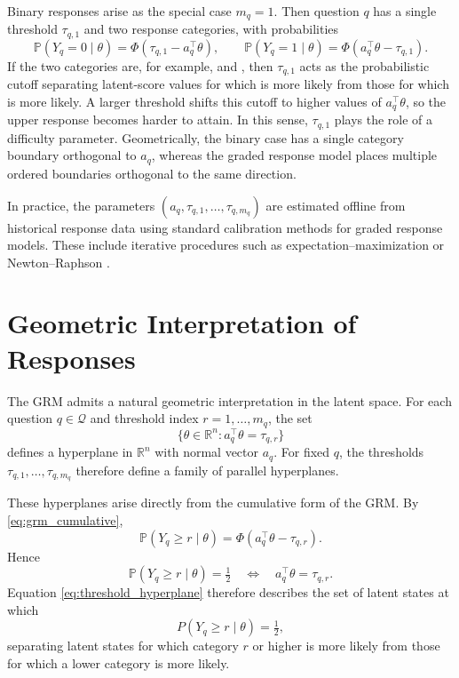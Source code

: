 \documentclass{article}
\begin{document}
\begin{remark}\label{rem:binary}
    Binary responses arise as the special case $m_q = 1$. Then question $q$ has a
single threshold $\tau_{q,1}$ and two response categories, with probabilities
\begin{equation*}
\mathbb P(Y_q = 0 \mid \theta) = \Phi(\tau_{q,1} - a_q^\top \theta),
\qquad
\mathbb P(Y_q = 1 \mid \theta) = \Phi(a_q^\top \theta - \tau_{q,1}).
\label{eq:grm_binary_special_case}
\end{equation*}
If the two categories are, for example,  and , then $\tau_{q,1}$
acts as the probabilistic cutoff separating latent-score values for which 
is more likely from those for which  is more likely. A larger threshold
shifts this cutoff to higher values of $a_q^\top \theta$, so the upper response
becomes harder to attain. In this sense, $\tau_{q,1}$ plays the role of a difficulty
parameter. Geometrically, the binary case has a single category boundary orthogonal
to $a_q$, whereas the graded response model places multiple ordered boundaries
orthogonal to the same direction.
\end{remark}

In practice, the parameters $(a_q,\tau_{q,1},\dots,\tau_{q,m_q})$ are estimated offline from historical response data using standard calibration methods for graded response models. These include iterative procedures such as expectation--maximization or Newton--Raphson \cite{bockAitkin1981,hambletonSwaminathanRogers1991irt}.

\section{Geometric Interpretation of Responses}\label{sec:geo}

The GRM admits a natural geometric interpretation in the latent space. For each
question $q \in \mathcal Q$ and threshold index $r = 1,\dots,m_q$, the set
\begin{equation}
\{\theta \in \mathbb R^n : a_q^\top \theta = \tau_{q,r}\}
\label{eq:threshold_hyperplane}
\end{equation}
defines a hyperplane in $\mathbb R^n$ with normal vector $a_q$. For fixed $q$, the
thresholds $\tau_{q,1},\dots,\tau_{q,m_q}$ therefore define a family of parallel
hyperplanes.

These hyperplanes arise directly from the cumulative form of the GRM. By
\eqref{eq:grm_cumulative},
\[
\mathbb P(Y_q \ge r \mid \theta) = \Phi(a_q^\top \theta - \tau_{q,r}).
\]
Hence
\begin{equation*}
\mathbb P(Y_q \ge r \mid \theta) = \tfrac{1}{2}
\quad \Longleftrightarrow \quad
a_q^\top \theta = \tau_{q,r}.
\label{eq:cumulative_half_probability}
\end{equation*}
Equation \eqref{eq:threshold_hyperplane} therefore describes the set of latent states at which
\[
P(Y_q \ge r \mid \theta)=\tfrac12,
\]
separating latent states for which category $r$ or higher is more likely from those
for which a lower category is more likely.
\end{document}
